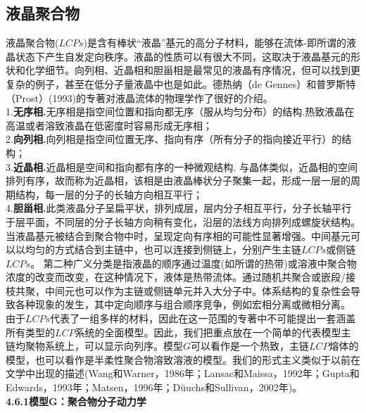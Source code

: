\subsection{液晶聚合物}

液晶聚合物($LCPs$)是含有棒状“液晶”基元的高分子材料，能够在流体-即所谓的液晶状态下产生自发定向秩序。液晶的性质可以有很大不同，这取决于液晶基元的形状和化学细节。向列相、近晶相和胆甾相是最常见的液晶有序情况，但可以找到更复杂的例子，甚至在低分子量液晶中也是如此。德热纳（de Gennes）和普罗斯特（Prost）(1993)的专著对液晶流体的物理学作了很好的介绍。\\

1.\textbf{无序相.}无序相是指空间位置和指向都无序（服从均匀分布）的结构.热致液晶在高温或者溶致液晶在低密度时容易形成无序相；\\

2.\textbf{向列相.}向列相是指空间位置无序、指向有序（所有分子的指向接近平行）的结构；\\

3.\textbf{近晶相.}近晶相是空间和指向都有序的一种微观结构. 与晶体类似，近晶相的空间排列有序，故而称为近晶相，该相是由液晶棒状分子聚集一起，形成一层一层的周期结构，每一层的分子的长轴方向相互平行；\\

4.\textbf{胆甾相.}此类液晶分子呈扁平状，排列成层，层内分子相互平行，分子长轴平行于层平面，不同层的分子长轴方向稍有变化，沿层的法线方向排列成螺旋状结构。\\

当液晶基元被结合到聚合物中时，呈现定向有序相的可能性显著增强。中间基元可以以均匀的方式结合到主链中，也可以连接到侧链上，分别产生主链$LCPs$或侧链$LCPs$。 第二种广义分类是指液晶的顺序通过温度(如所谓的热带)或溶液中聚合物浓度的改变而改变，在这种情况下，液体是热带流体。通过随机共聚合或嵌段/接枝共聚，中间元也可以作为主链或侧链单元并入大分子中。体系结构的复杂性会导致各种现象的发生，其中定向顺序与组合顺序竞争，例如宏相分离或微相分离。\\

由于$LCPs$代表了一组多样的材料，因此在这一范围的专著中不可能提出一套涵盖所有类型的$LCP$系统的全面模型。因此，我们把重点放在一个简单的代表模型主链均聚物系统上，可以显示向列序。模型$G$可以看作是一个热致，主链$LCP$熔体的模型，也可以看作是半柔性聚合物溶致溶液的模型。我们的形式主义类似于以前在文学中出现的描述(Wang和Warner，1986年；Lansac和Maissa，1992年；Gupta和Edwards，1993年；Matsen，1996年；Düuchs和Sullivan，2002年)。\\


\textbf{4.6.1模型G：聚合物分子动力学}

